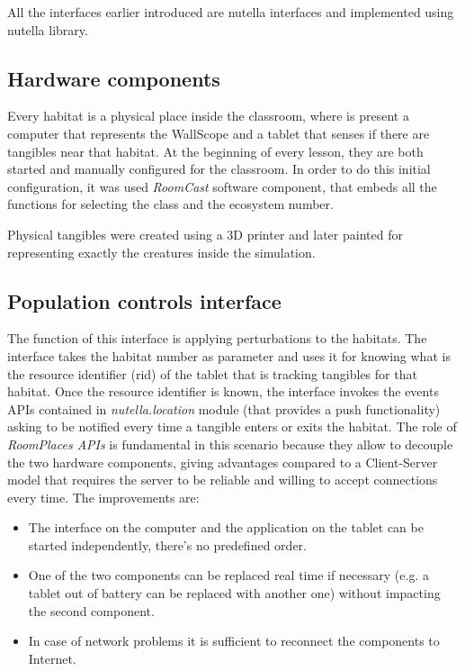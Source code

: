 All the interfaces earlier introduced are nutella interfaces and implemented using nutella library.

\subsection{Hardware components}
Every habitat is a physical place inside the classroom, where is present a computer that represents the WallScope and a tablet that senses if there are tangibles near that habitat. At the beginning of every lesson, they are both started and manually configured for the classroom. In order to do this initial configuration, it was used \textit{RoomCast} software component, that embeds all the functions for selecting the class and the ecosystem number.

Physical tangibles were created using a 3D printer and later painted for representing exactly the creatures inside the simulation.

\subsection{Population controls interface}
\label{subsec:population_control_interface}

The function of this interface is applying perturbations to the habitats. The interface takes the habitat number as parameter and uses it for knowing what is the resource identifier (rid) of the tablet that is tracking tangibles for that habitat. Once the resource identifier is known, the interface invokes the events APIs contained in \textit{nutella.location} module (that provides a push functionality) asking to be notified every time a tangible enters or exits the habitat. The role of \textit{RoomPlaces APIs} is fundamental in this scenario because they allow to decouple the two hardware components, giving advantages compared to a Client-Server model that requires the server to be reliable and willing to accept connections every time. The improvements are:
\begin{itemize}
    \item The interface on the computer and the application on the tablet can be started independently, there's no predefined order.
    \item One of the two components can be replaced real time if necessary (e.g. a tablet out of battery can be replaced with another one) without impacting the second component.
    \item In case of network problems it is sufficient to reconnect the components to Internet.
\end{itemize}

